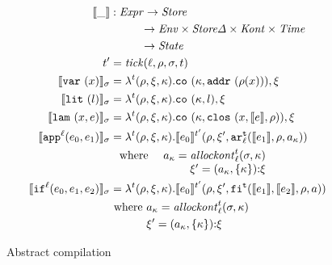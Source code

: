 \documentclass[preprint,onecolumn,9pt]{sigplanconf} %
\begin{document}
\begin{figure}
\begin{align*}
\compile{\_} &: \Expr \to \Store \\
             &\phantom{: \Expr } \to \Env  \times \StoreDelta \times \Kont \times \Counter \\
             &\phantom{: \Expr } \to \State \\
\mcntr' &= \tick(\mlab,\menv,\msto,\mcntr) \\
\compile{\svar\mvar}_\msto &=
 \lambda^\mcntr(\menv,\msdiff,\mkont) .
\spchoice
{\co{\mkont,\saddr{\menv(\mvar)}},\msdiff}
{\co{\mkont,\superposition{\msto(\menv(\mvar))}},\msdiff}
\\
\compile{\slit\mlit}_\msto &= \lambda^\mcntr(\menv,\msdiff,\mkont) .
\co{\mkont,\mlit},\msdiff
\\
\compile{\slam\mvar\mexp}_\msto &= \lambda^\mcntr(\menv,\msdiff,\mkont) .
\co{\mkont,\clos{\mvar,\compile{\mexp},\menv}},\msdiff
\\
\compile{\sapp[^\mlab]{\mexpi0}{\mexpi1}}_\msto &= \lambda^\mcntr(\menv,\msdiff,\mkont) .
\compile{\mexpi0}^{\mcntr'}(\menv,\msdiff',\kar[_\mlab^\mcntr]{\compile{\mexpi1},\menv,\maddr_\mkont})
\\
&\setlength\arraycolsep{5pt}
\begin{array}{lrl}
\text{ where } & \maddr_\mkont = \allockont^\mcntr_\mlab(\msto,\mkont) \\
               & \msdiff' = \cons{\ttuple{\maddr_\mkont}{\setof{\mkont}}}{\msdiff}
\end{array}
\\
\compile{\sif[^\mlab]{\mexpi0}{\mexpi1}{\mexpi2}}_\msto &= \lambda^\mcntr(\menv,\msdiff,\mkont) .
\compile{\mexpi0}^{\mcntr'}(\menv,\msdiff',\kif[^\mcntr]{\compile{\mexpi1},\compile{\mexpi2},\menv,\maddr})
\\
&\text{ where }\maddr_\mkont = \allockont^\mcntr_\mlab(\msto,\mkont) \\
&\phantom{\text{ where }} \msdiff' = \cons{\ttuple{\maddr_\mkont}{\setof{\mkont}}}{\msdiff}
\end{align*}
\caption{Abstract compilation}
\label{fig:compile}
\end{figure}
\end{document}
